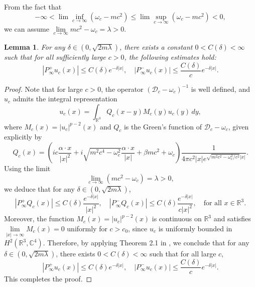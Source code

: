 \documentclass{amsart}
\theoremstyle{plain}
\newtheorem{lemma}[theorem]{Lemma}
\theoremstyle{definition}
\theoremstyle{remark}
\numberwithin{equation}{section} \numberwithin{figure}{section}
\begin{document}
{

From the fact that
\begin{equation}\label{new_m}
  -\infty<\lim\inf_{c\to\infty}(\omega_c-mc^2)\leq\lim\sup_{c\to\infty}(\omega_c-mc^2)<0,
\end{equation}
we can assume 
$
\lim\limits_{c\to\infty}mc^2- \omega_c = \lambda>0.
$
\begin{lemma}
  For any $\delta \in (0, \sqrt{2m\lambda})$, there exists a constant $0 < C(\delta) < \infty$ such that for all sufficiently large $c > 0$, the following estimates hold:
  \[
  |P_\infty^+ u_c(x)| \leq C(\delta) e^{-\delta |x|}, \quad
  |P_\infty^- u_c(x)| \leq \frac{C(\delta)}{c} e^{-\delta |x|}.
  \]
\end{lemma}

\begin{proof}
  Note that for large $c > 0$, the operator $(\mathscr{D}_c - \omega_c)^{-1}$ is well defined, and $u_c$ admits the integral representation
  \[
  u_c(x) = \int_{\mathbb{R}^3} Q_c(x - y) M_c(y) u_c(y) \, dy,
  \]
  where $M_c(x) = |u_c|^{p-2}(x)$ and $Q_c$ is the Green's function of $\mathscr{D}_c - \omega_c$, given explicitly by
  \[
  Q_c(x) = \left( ic \frac{\alpha \cdot x}{|x|^2} + i\sqrt{m^2c^4 - \omega_c^2} \frac{\alpha \cdot x}{|x|} + \beta m c^2 + \omega_c \right)
  \frac{1}{4\pi c^2 |x| e^{\sqrt{m^2 c^2 - \omega_c^2/c^2} |x|}}.
  \]  
  Using the limit
  \[
  \lim_{c \to \infty} (m c^2 - \omega_c) = \lambda > 0,
  \]
  we deduce that for any $\delta \in (0, \sqrt{2m\lambda})$,
  \[
  |P_\infty^+ Q_c(x)| \leq C(\delta) \frac{e^{-\delta |x|}}{|x|^2}, \quad
  |P_\infty^- Q_c(x)| \leq C(\delta) \frac{e^{-\delta |x|}}{c |x|^2}, \quad \text{for all } x \in \mathbb{R}^3.
  \]  
  Moreover, the function $M_c(x) = |u_c|^{p-2}(x)$ is continuous on $\mathbb{R}^3$ and satisfies $\lim\limits_{|x| \to \infty} M_c(x) = 0$ uniformly for $c > c_0$, since $u_c$ is uniformly bounded in $H^2(\mathbb{R}^3, \mathbb{C}^4)$. Therefore, by applying Theorem 2.1 in \cite{MR1785381}, we conclude that for any $\delta \in (0, \sqrt{2m\lambda})$, there exists $0 < C(\delta) < \infty$ such that for all large $c$,
  \[
  |P_\infty^+ u_c(x)| \leq C(\delta) e^{-\delta |x|}, \quad
  |P_\infty^- u_c(x)| \leq \frac{C(\delta)}{c} e^{-\delta |x|}.
  \]
  This completes the proof.
\end{proof}


}
\end{document}
